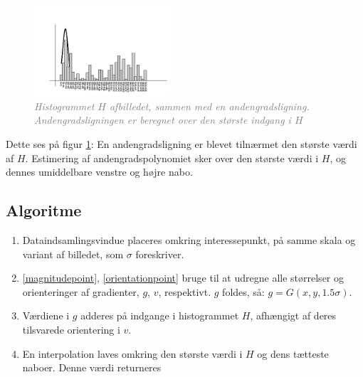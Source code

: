 \begin{figure}[H]
    \centering
    \includegraphics[width=0.45\textwidth]{fig/sift-orientation-histogram.jpg}
     \vspace{-1em}
    \begin{center}    
       \caption{\textcolor{gray}{\footnotesize \textit{Histogrammet $H$ afbilledet, sammen med en andengradsligning. Andengradsligningen er beregnet over den største indgang i $H$}}}
    \label{histogramheight}
     \end{center}
     \vspace{-2.5em}
  \end{figure} \noindent

Dette ses på figur \ref{histogramheight}: En andengradsligning er blevet tilnærmet den største værdi af $H$. Estimering af andengradspolynomiet sker over den største værdi i $H$, og dennes umiddelbare venstre og højre nabo.

\subsection*{Algoritme}
\begin{enumerate}
\item Dataindsamlingsvindue placeres omkring interessepunkt, på samme skala og variant af billedet, som $\sigma$ foreskriver.
\item \eqref{magnitudepoint}, \eqref{orientationpoint} bruge til at udregne alle størrelser og orienteringer af gradienter, $g$, $v$, respektivt. $g$ foldes, så: $g = G(x,y,1.5\sigma)$.
\item Værdiene i $g$ adderes på indgange i histogrammet $H$, afhængigt af deres tilsvarede orientering i $v$.
\item En interpolation laves omkring den største værdi i $H$ og dens tætteste naboer. Denne værdi returneres
\end{enumerate}
